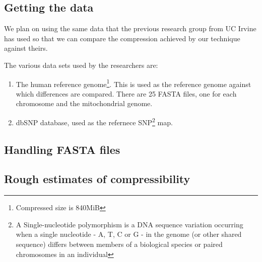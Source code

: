 \documentclass[11pt,twocolumn]{article}
\begin{document}
\subsection*{Getting the data}

We plan on using the same data that the previous research group from
UC Irvine has used so that we can compare the compression achieved by
our technique against theirs.

The various data sets used by the researchers are:

\begin{enumerate}

\item The human reference genome\footnote{Compressed size is
  840MiB}. This is used as the reference genome against which
  differences are compared. There are 25 FASTA files, one for each
  chromosome and the mitochondrial genome.

\item dbSNP database, used as the refernece SNP\footnote{A
  Single-nucleotide polymorphism is a DNA sequence variation occurring
  when a single nucleotide - A, T, C or G - in the genome (or other
  shared sequence) differs between members of a biological species or
  paired chromosomes in an individual} map.


\end{enumerate}


\subsection*{Handling FASTA files}


\subsection*{Rough estimates of compressibility}

\clearpage

\end{document}
